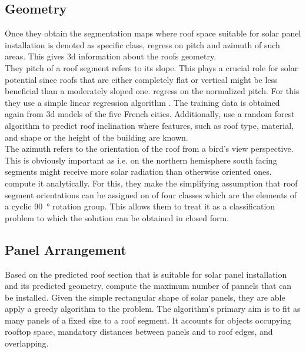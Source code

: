 \documentclass{article} %
\begin{document}
\subsection*{Geometry}
Once they obtain the segmentation maps where roof space suitable for solar panel installation is denoted as specific class, \citet{de2021predicting} regress on pitch and azimuth of such areas. This gives 3d information about the roofs geometry.\\
They pitch of a roof segment refers to its slope. This plays a crucial role for solar potential since roofs that are either completely flat or vertical might be less beneficial than a moderately sloped one. \citet{de2021predicting} regress on the normalized pitch. For this they use a simple linear regression algorithm \cite{gross2003linear}. The training data is obtained again from 3d models of the five French cities. Additionally,\citet{de2021predicting} use a random forest algorithm \cite{belgiu2016random} to predict roof inclination where features, such as roof type, material, and shape or the height of the building are known.\\
The azimuth refers to the orientation of the roof from a bird's view perspective. This is obviously important as i.e. on the northern hemisphere south facing segments might receive more solar radiation than otherwise oriented ones.\\ \citet{de2021predicting} compute it analytically. For this, they make the simplifying assumption that roof segment orientations can be assigned on of four classes which are the elements of a cyclic \SI{90}{\degree} rotation group. This allows them to treat it as a classification problem to which the solution can be obtained in closed form.

\subsection*{Panel Arrangement}
Based on the predicted roof section that is suitable for solar panel installation and its predicted geometry, \citet{de2021predicting} compute the maximum number of pannels that can be installed. Given the simple rectangular shape of solar panels, they are able apply a greedy algorithm to the problem. The algorithm's primary aim is to fit as many panels of a fixed size to a roof segment. It accounts for objects occupying rooftop space, mandatory distances between panels and to roof edges, and overlapping.
\end{document}
